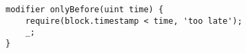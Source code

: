 \begin{lstlisting}[language=Solidity]
modifier onlyBefore(uint time) {
    require(block.timestamp < time, 'too late');
    _;
}
\end{lstlisting}